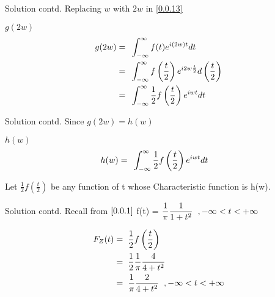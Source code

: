 \documentclass{beamer}
\providecommand{\brak}[1]{\ensuremath{\left(#1\right)}}
\begin{document}
\begin{frame}{Solution contd.}
  Replacing $w$ with $2w$ in \eqref{0.0.13}
  \begin{block}{$g(2w)$}
    \begin{align}
      g(2w) = & \hspace{0.2cm}  \int_{-\infty}^{\infty}  f(t) {e}^{i(2w)t} dt                                         \\
      =       & \hspace{0.2cm}  \int_{-\infty}^{\infty}  f\brak{\frac{t}{2}} {e}^{i2w\frac{t}{2}} d\brak{\frac{t}{2}} \\
      =       & \hspace{0.2cm}  \int_{-\infty}^{\infty}  \frac{1}{2} f\brak{\frac{t}{2}} {e}^{iwt} dt
    \end{align}
  \end{block}
\end{frame}
\begin{frame}{Solution contd.}
  Since $g(2w) = h(w)$
  \begin{block}{$h(w)$}
    \begin{align}
      h(w) = & \hspace{0.2cm}  \int_{-\infty}^{\infty}  \frac{1}{2} f\brak{\frac{t}{2}} {e}^{iwt} dt
    \end{align}
  \end{block}
  Let $\frac{1}{2} f\brak{\frac{t}{2}}$ be any function of t whose Characteristic function is h(w).
\end{frame}
\begin{frame}{Solution contd.}
  Recall from $\eqref{0.0.1}$ f(t) = $\displaystyle\frac{1}{\pi} \frac{1}{1+{t}^2} \hspace{0.2cm},-\infty < t < +\infty$
  \begin{block}{}
    \begin{align}
      F_Z(t) = & \hspace{0.2cm} \frac{1}{2} f\brak{\frac{t}{2}}                                                 \\
      =        & \hspace{0.2cm} \frac{1}{2} \displaystyle\frac{1}{\pi}  \frac{4}{4+{t}^2}                       \\
      =        & \hspace{0.2cm} \displaystyle\frac{1}{\pi}  \frac{2}{4+{t}^2} \hspace{0.2cm}, -\infty<t<+\infty
    \end{align}
  \end{block}
\end{frame}
\end{document}
